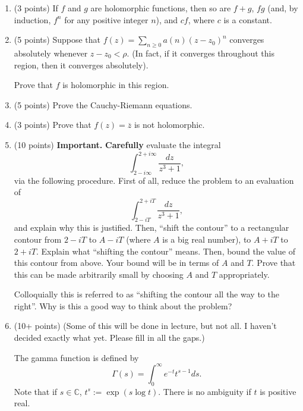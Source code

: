 \documentclass[12pt]{article}
\begin{document}
\begin{enumerate}
\item (3 points)
If $f$ and $g$ are holomorphic functions, then so are $f + g$, $fg$ (and, by induction,
$f^n$ for any positive integer $n$), and $cf$, where $c$ is a constant.

\item (5 points)
Suppose that $f(z) = \sum_{n \geq 0} a(n) (z - z_0)^n$ converges absolutely whenever
$z - z_0 < \rho$. (In fact, if it converges throughout this region, then it converges absolutely).

Prove that $f$ is holomorphic in this region.

\item (5 points)
Prove the Cauchy-Riemann equations.

\item (3 points)
Prove that $f(z) = \overline{z}$ is not holomorphic.

\item (10 points)
{\bf Important.} {\bf Carefully} evaluate the integral
\begin{equation}
\int_{2 - i \infty}^{2 + i \infty} \frac{dz}{z^3 + 1},
\end{equation}
via the following procedure. First of all, reduce the problem to
an evaluation of 
\begin{equation}
\int_{2- i T}^{2 + i T} \frac{dz}{z^3 + 1},
\end{equation}
and explain why this is justified. Then, ``shift the contour'' to
a rectangular contour from $2 - iT$ to $A - iT$ (where $A$ is a big real number),
to $A + iT$ to $2 + iT$. Explain what ``shifting the contour'' means.
Then, bound the value of this contour from above. Your bound will
be in terms of $A$ and $T$. Prove that this can be made arbitrarily small
by choosing $A$ and $T$ appropriately.

Colloquially this is referred to as ``shifting the contour all the way to the right''.
Why is this a good way to think about the problem?

\item (10+ points)
(Some of this will be done in lecture, but not all. I haven't decided exactly what yet.
Please fill in all the gaps.)

The gamma function is defined by
\begin{equation}
\Gamma(s) = \int_0^{\infty} e^{-t} t^{s - 1} ds.
\end{equation}
Note that if $s \in \mathbb{C}$, $t^s := \exp(s \log t)$. There is no ambiguity if $t$ is positive real.


\end{enumerate}
\end{document}
